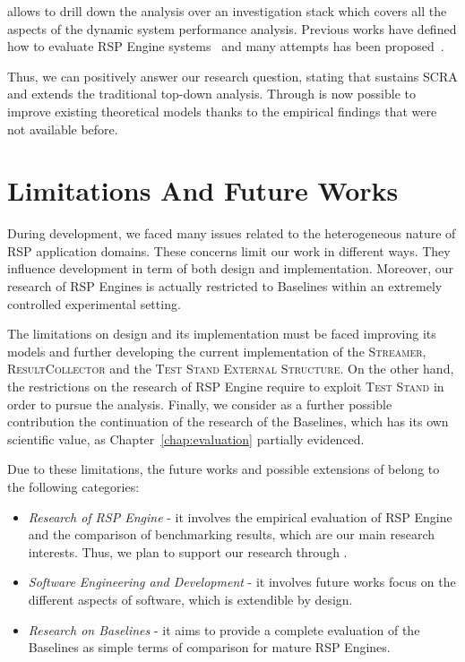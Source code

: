 \noindent \name allows to drill down the analysis over an investigation stack which covers all the aspects of the dynamic system performance analysis. Previous works have defined how to evaluate RSP Engine systems~\cite{DBLP:conf/esws/ScharrenbachUMVB13} and many attempts has been proposed~\cite{Zhang2012, LePhuoc2012c, DBLP:conf/semweb/DellAglioCBCV13}. 

Thus, we can positively answer our research question, stating that \name sustains SCRA and extends the traditional top-down analysis. Through \name is now possible to improve existing theoretical models thanks to the empirical findings that were not available before.

\section{Limitations And Future Works}\label{sec:research-fw-conclusion}

During \name development, we faced many issues related to the heterogeneous nature of RSP application domains. These concerns limit our work in different ways. They influence \name development in term of both design and implementation. Moreover, our research of RSP Engines  is actually restricted to \name Baselines within an extremely controlled experimental setting.

The limitations on \name design and its implementation must be faced improving its models and further developing the current implementation of the \textsc{Streamer}, \textsc{ResultCollector} and the \textsc{Test Stand External Structure}. On the other hand, the restrictions on the research of RSP Engine require to exploit \name \textsc{Test Stand} in order to pursue the analysis. Finally, we consider as a further possible contribution the continuation of the research of the Baselines, which has its own scientific value, as Chapter~\ref{chap:evaluation} partially evidenced.

Due to these limitations, the future works and possible extensions of \name belong to the following categories:
\begin{itemize}
\item \textit{Research of RSP Engine} - it involves the empirical evaluation of RSP Engine and the comparison of benchmarking results, which are our main research interests. Thus, we plan to support our research through \namens.
\item \textit{Software Engineering and Development} - it involves future works focus on the different aspects of \name software, which is extendible by design.
\item \textit{Research on Baselines} - it aims to provide a complete evaluation of the Baselines as simple terms of comparison for mature RSP Engines.
\end{itemize}


